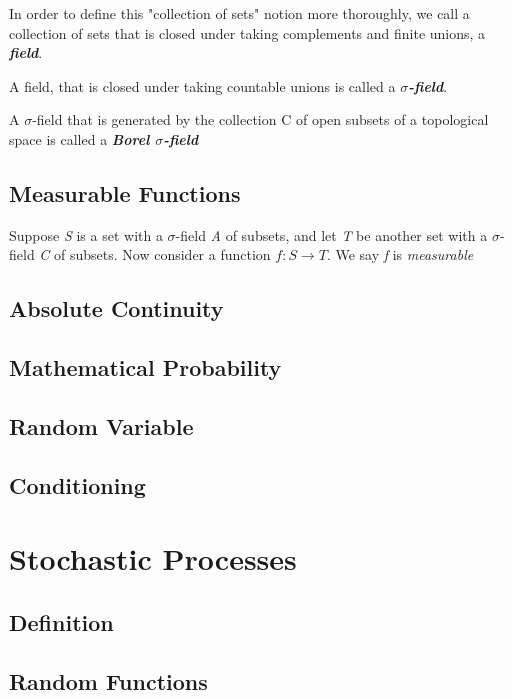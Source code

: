 \documentclass{article}
\begin{document}
In order to define this "collection of sets" notion more thoroughly, we call a collection of sets that is closed under taking complements and finite unions, a \textbf{\textit{field}}.

A field, that is closed under taking countable unions is called a \textbf{\textit{$\sigma$-field}}.

A $\sigma$-field that is generated by the collection C of open subsets of a topological space is called a \textbf{\textit{Borel $\sigma$-field}}
\subsection{Measurable Functions}

Suppose \textit{S} is a set with a $\sigma$-field \textit{A} of subsets, and let \textit{T} be another set with a $\sigma$-field \textit{C} of subsets. Now consider a function $f : S \rightarrow T$. We say \textit{f} is \textit{measurable} 

\subsection{Absolute Continuity}

\subsection{Mathematical Probability}

\subsection{Random Variable}

\subsection{Conditioning}

\section{Stochastic Processes}

\subsection{Definition}

\subsection{Random Functions}
\end{document}

